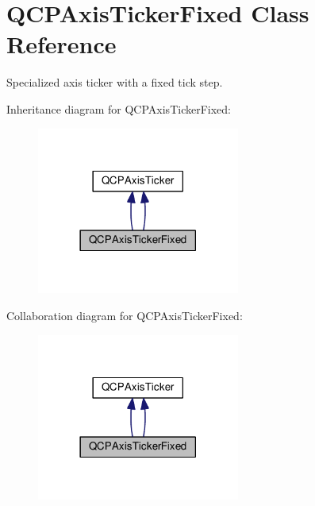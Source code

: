 \hypertarget{class_q_c_p_axis_ticker_fixed}{}\section{Q\+C\+P\+Axis\+Ticker\+Fixed Class Reference}
\label{class_q_c_p_axis_ticker_fixed}


Specialized axis ticker with a fixed tick step.  




Inheritance diagram for Q\+C\+P\+Axis\+Ticker\+Fixed\+:\nopagebreak
\begin{figure}[H]
\begin{center}
\leavevmode
\includegraphics[width=189pt]{class_q_c_p_axis_ticker_fixed__inherit__graph}
\end{center}
\end{figure}


Collaboration diagram for Q\+C\+P\+Axis\+Ticker\+Fixed\+:\nopagebreak
\begin{figure}[H]
\begin{center}
\leavevmode
\includegraphics[width=189pt]{class_q_c_p_axis_ticker_fixed__coll__graph}
\end{center}
\end{figure}
